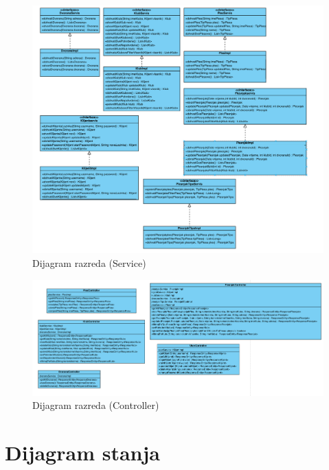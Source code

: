     	\begin{figure}[H]
    		\centering
    		\includegraphics[width=\textwidth]{slike/dijagram_razreda/service.png}
    		\caption{Dijagram razreda (Service)}
    		\label{fig:my_label}
    	\end{figure}
    	
    	\begin{figure}[H]
    		\centering
    		\includegraphics[width=\textwidth]{slike/dijagram_razreda/controller.png}
    		\caption{Dijagram razreda (Controller)}
    		\label{fig:my_label}
    	\end{figure}
			
	
			
			\section{Dijagram stanja}
			
